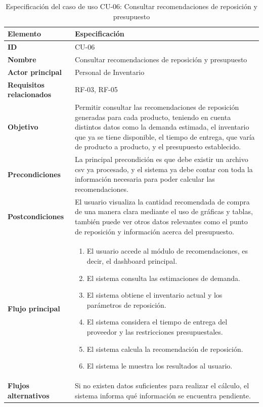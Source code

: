 \begin{table}[H]
\centering
\caption{Especificación del caso de uso CU-06: Consultar recomendaciones de reposición y presupuesto}
\label{tab:cu06_recomendaciones}
\renewcommand{\arraystretch}{1.3}
\begin{tabularx}{\textwidth}{|>{\bfseries}p{3.5cm}|X|}
\hline
Elemento & Especificación \\
\hline
ID & CU-06 \\
\hline
Nombre & Consultar recomendaciones de reposición y presupuesto \\
\hline
Actor principal & Personal de Inventario \\
\hline
Requisitos relacionados & RF-03, RF-05 \\
\hline
Objetivo & Permitir consultar las recomendaciones de reposición generadas para cada producto, teniendo en cuenta distintos datos como la demanda estimada, el inventario que ya se tiene disponible, el tiempo de entrega, que varía de producto a producto, y el presupuesto establecido. \\
\hline
Precondiciones & La principal precondición es que debe existir un archivo csv ya procesado, y el sistema ya debe contar con toda la información necesaria para poder calcular las recomendaciones. \\
\hline
Postcondiciones & El usuario visualiza la cantidad recomendada de compra de una manera clara mediante el uso de gráficas y tablas, también puede ver otros datos relevantes como el punto de reposición y información acerca del presupuesto. \\
\hline
Flujo principal &
\begin{enumerate}
    \item El usuario accede al módulo de recomendaciones, es decir, el dashboard principal.
    \item El sistema consulta las estimaciones de demanda.
    \item El sistema obtiene el inventario actual y los parámetros de reposición.
    \item El sistema considera el tiempo de entrega del proveedor y las restricciones presupuestales.
    \item El sistema calcula la recomendación de reposición.
    \item El sistema le muestra los resultados al usuario.
\end{enumerate} \\
\hline
Flujos alternativos & Si no existen datos suficientes para realizar el cálculo, el sistema informa qué información se encuentra pendiente. \\
\hline
\end{tabularx}
\end{table}


